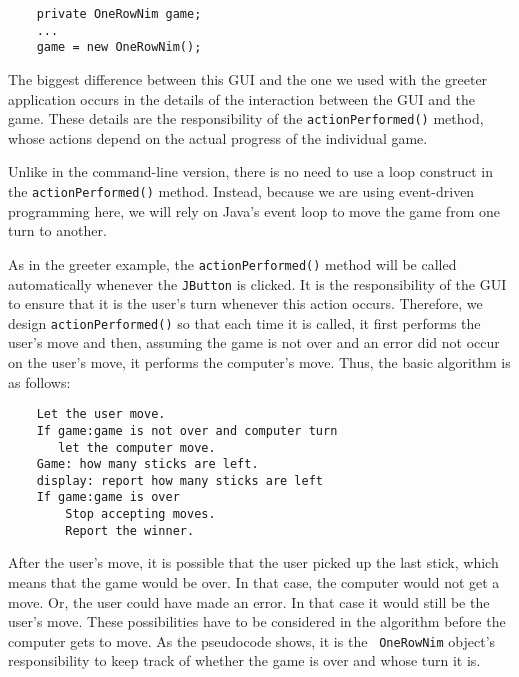 \begin{jjjlisting}
\begin{lstlisting}
    private OneRowNim game;
    ...
    game = new OneRowNim();
\end{lstlisting}
\end{jjjlisting}

\noindent The biggest difference between this GUI and the one we used 
with the greeter application occurs in the details of the interaction
between the GUI and the game.  These details are the responsibility of
the {\tt actionPerformed()} method, whose actions depend on the actual
progress of the individual game.

Unlike in the command-line version, there is no need to use a loop
construct in the {\tt actionPerformed()} method. Instead, because we
are using event-driven programming here, we will rely on Java's event
loop to move the game from one turn to another.

As in the greeter example, the {\tt actionPerformed()} method will be
called automatically whenever the {\tt JButton} is clicked. 
It is the responsibility
of the GUI to ensure that it is the user's turn whenever this action
occurs. Therefore, we design {\tt actionPerformed()} so that each time
it is called, it first performs the user's move and then, assuming the
game is not over and an error did not occur on the user's move, it
performs the computer's move.  Thus, the basic algorithm is as
follows:

\begin{jjjlisting}
\begin{lstlisting}
    Let the user move.
    If game:game is not over and computer turn
       let the computer move.
    Game: how many sticks are left.
    display: report how many sticks are left
    If game:game is over
        Stop accepting moves.
        Report the winner.
\end{lstlisting}
\end{jjjlisting}

\noindent After the user's move, it is possible that the user
picked up the last stick, which means that the game would be over. In
that case, the computer would not get a move.  Or, the user could have
made an error. In that case it would still be the user's move. These
possibilities have to be considered in the algorithm before the
computer gets to move. As the pseudocode shows, it is the {\tt
OneRowNim} object's responsibility to keep track of whether the
game is over and whose turn it is.

